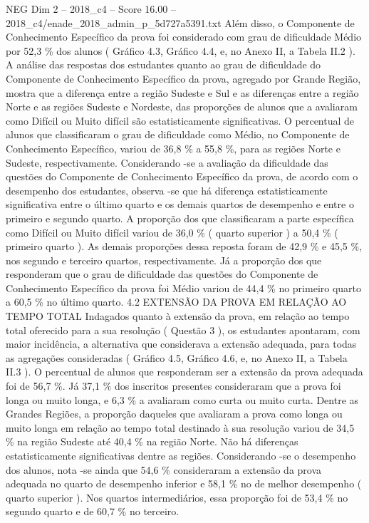 \begin{textsample}{NEG Dim 2 – 2018\_c4 – Score 16.00 – 2018\_c4/enade\_2018\_admin\_p\_5d727a5391.txt}
Além disso, o Componente de Conhecimento Específico da prova foi considerado com grau de dificuldade Médio por 52,3 \% dos alunos ( Gráfico 4.3, Gráfico 4.4, e, no Anexo II, a Tabela II.2 ).
A análise das respostas dos estudantes quanto ao grau de dificuldade do Componente de Conhecimento Específico da prova, agregado por Grande Região, mostra que a diferença entre a região Sudeste e Sul e as diferenças entre a região Norte e as regiões Sudeste e Nordeste, das proporções de alunos que a avaliaram como Difícil ou Muito difícil são estatisticamente significativas.
O percentual de alunos que classificaram o grau de dificuldade como Médio, no Componente de Conhecimento Específico, variou de 36,8 \% a 55,8 \%, para as regiões Norte e Sudeste, respectivamente.
Considerando -se a avaliação da dificuldade das questões do Componente de Conhecimento Específico da prova, de acordo com o desempenho dos estudantes, observa -se que há diferença estatisticamente significativa entre o último quarto e os demais quartos de desempenho e entre o primeiro e segundo quarto.
A proporção dos que classificaram a parte específica como Difícil ou Muito difícil variou de 36,0 \% ( quarto superior ) a 50,4 \% ( primeiro quarto ).
As demais proporções dessa reposta foram de 42,9 \% e 45,5 \%, nos segundo e terceiro quartos, respectivamente.
Já a proporção dos que responderam que o grau de dificuldade das questões do Componente de Conhecimento Específico da prova foi Médio variou de 44,4 \% no primeiro quarto a 60,5 \% no último quarto. 4.2 EXTENSÃO DA PROVA EM RELAÇÃO AO TEMPO TOTAL Indagados quanto à extensão da prova, em relação ao tempo total oferecido para a sua resolução ( Questão 3 ), os estudantes apontaram, com maior incidência, a alternativa que considerava a extensão adequada, para todas as agregações consideradas ( Gráfico 4.5, Gráfico 4.6, e, no Anexo II, a Tabela II.3 ).
O percentual de alunos que responderam ser a extensão da prova adequada foi de 56,7 \%.
Já 37,1 \% dos inscritos presentes consideraram que a prova foi longa ou muito longa, e 6,3 \% a avaliaram como curta ou muito curta.
Dentre as Grandes Regiões, a proporção daqueles que avaliaram a prova como longa ou muito longa em relação ao tempo total destinado à sua resolução variou de 34,5 \% na região Sudeste até 40,4 \% na região Norte.
Não há diferenças estatisticamente significativas dentre as regiões.
Considerando -se o desempenho dos alunos, nota -se ainda que 54,6 \% consideraram a extensão da prova adequada no quarto de desempenho inferior e 58,1 \% no de melhor desempenho ( quarto superior ).
Nos quartos intermediários, essa proporção foi de 53,4 \% no segundo quarto e de 60,7 \% no terceiro.

\end{textsample}
